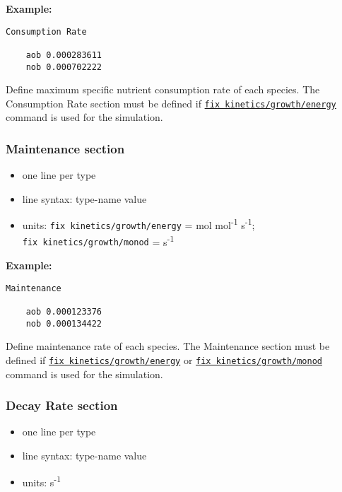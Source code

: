 \documentclass[11pt,a4paper,openright]{article}
\begin{document}
\textbf{Example:}
\begin{Verbatim}[frame=single]
 Consumption Rate

    aob 0.000283611
    nob 0.000702222

\end{Verbatim}

Define maximum specific nutrient consumption rate of each species.  The Consumption Rate section must be defined if 
\hyperref[fkineticsenergy]{\tt fix kinetics/growth/energy} command is used for the simulation. 

\subsubsection{Maintenance section}
\label{smaintain}
\begin{itemize} [nosep]
    \item one line per type
    \item line syntax: type-name {} value 
    \item units: {\tt fix kinetics/growth/energy} = mol mol\textsuperscript{-1} s\textsuperscript{-1};\\  
    {\tt fix kinetics/growth/monod} =  s\textsuperscript{-1}\\
    
\end{itemize} 

\textbf{Example:}
\begin{Verbatim}[frame=single]
 Maintenance

    aob 0.000123376
    nob 0.000134422

\end{Verbatim}

Define maintenance rate of each species.  The Maintenance section must be defined if 
\hyperref[fkineticsenergy]{\tt fix kinetics/growth/energy} or \hyperref[fkineticsmonod]{\tt fix kinetics/growth/monod} 
command is used for the simulation. 


\subsubsection{Decay Rate section}
\label{sdecay}
\begin{itemize} [nosep]
    \item one line per type
    \item line syntax: type-name {} value 
    \item units: s\textsuperscript{-1} \\  
    
\end{itemize} 
\end{document}
